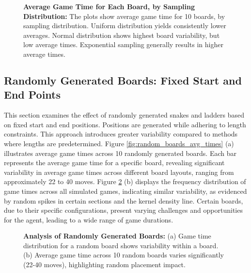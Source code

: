 \begin{figure}[ht]
	\centering
	\linebreak
	\caption{\textbf{Average Game Time for Each Board, by Sampling Distribution:} The plots show average game time for 10 boards, by sampling distribution. Uniform distribution yields consistently lower averages. Normal distribution shows highest board variability, but low average times. Exponential sampling generally results in higher average times.}
	\label{fig:sampling_dist_board_avg_times}
\end{figure}


\subsection{Randomly Generated Boards: Fixed Start and End Points}

This section examines the effect of randomly generated snakes and ladders based on fixed start and end positions. Positions are generated while adhering to length constraints. This approach introduces greater variability compared to methods where lengths are predetermined. Figure \ref{fig:random_boards_avg_times} (a) illustrates average game times across 10 randomly generated boards. Each bar represents the average game time for a specific board, revealing significant variability in average game times across different board layouts, ranging from approximately 22 to 40 moves. Figure \ref{fig:random_boards_game_dist} (b) displays the frequency distribution of game times across all simulated games, indicating similar variability, as evidenced by random spikes in certain sections and the kernel density line. Certain boards, due to their specific configurations, present varying challenges and opportunities for the agent, leading to a wide range of game durations.

\begin{figure}[ht]
	\centering
	\caption{\textbf{Analysis of Randomly Generated Boards:} (a) Game time distribution for a random board shows variability within a board. (b) Average game time across 10 random boards varies significantly (22-40 moves), highlighting random placement impact.}
	\label{fig:random_boards_avg_times}
	\label{fig:random_boards_game_dist}
\end{figure}


